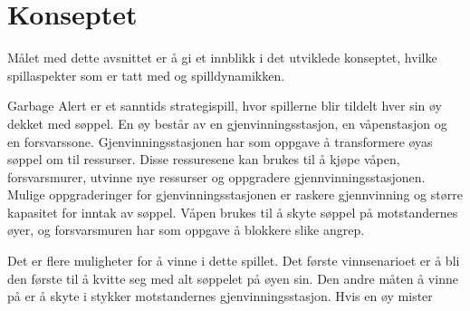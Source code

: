 \section{Konseptet}\label{sec:konsept}
Målet med dette avsnittet er å gi et innblikk i det utviklede konseptet,
hvilke spillaspekter som er tatt med og spilldynamikken.

Garbage Alert er et sanntids strategispill, hvor spillerne blir tildelt
hver sin øy dekket med søppel. En øy består av en gjenvinningsstasjon,
en våpenstasjon og en forsvarssone. Gjenvinningsstasjonen har som
oppgave å transformere øyas søppel om til ressurser. Disse ressuresene
kan brukes til å kjøpe våpen, forsvarsmurer, utvinne nye ressurser og
oppgradere gjennvinningsstasjonen. Mulige oppgraderinger for
gjenvinningsstasjonen er raskere gjennvinning og større kapasitet for
inntak av søppel. Våpen brukes til å skyte søppel på motstandernes øyer,
og forsvarsmuren har som oppgave å blokkere slike angrep. 

Det er flere muligheter for å vinne i dette spillet. Det første
vinnsenarioet er å bli den første til å kvitte seg med alt søppelet på
øyen sin. Den andre måten å vinne på er å skyte i stykker motstandernes
gjenvinningsstasjon. Hvis en øy mister  
